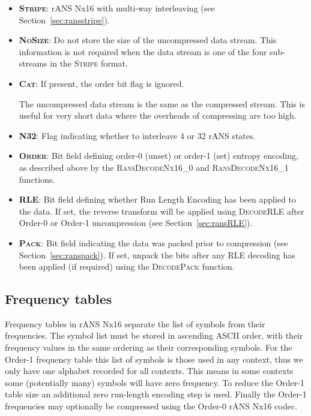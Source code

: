\documentclass[a4paper]{article}
\begin{document}
\begin{itemize}
\item{\textbf{\textsc{Stripe}}:}
rANS Nx16 with multi-way interleaving (see Section~\ref{sec:ransstripe}).

\item{\textbf{\textsc{NoSize}}:}
Do not store the size of the uncompressed data stream.
This information is not required when the data stream is one of the four sub-streams in the \textsc{Stripe} format.

\item{\textbf{\textsc{Cat}}:}
If present, the order bit flag is ignored.

The uncompressed data stream is the same as the compressed stream.
This is useful for very short data where the overheads of compressing are too high.

\item{\textbf{\textsc{N32}}:}
Flag indicating whether to interleave 4 or 32 rANS states.

\item{\textbf{\textsc{Order}}:}
Bit field defining order-0 (unset) or order-1 (set) entropy encoding, as described above by the \textsc{RansDecodeNx16\_0} and \textsc{RansDecodeNx16\_1} functions.

\item{\textbf{\textsc{RLE}}:}
Bit field defining whether Run Length Encoding has been applied to the data.  If set, the reverse transform will be applied using \textsc{DecodeRLE} after Order-0 or Order-1 uncompression (see Section~\ref{sec:ransRLE}).

\item{\textbf{\textsc{Pack}}:}
Bit field indicating the data was packed prior to compression (see Section~\ref{sec:ranspack}).  If set, unpack the bits after any RLE decoding has been applied (if required) using the \textsc{DecodePack} function.
\end{itemize}

\subsection{Frequency tables}

Frequency tables in rANS Nx16 separate the list of symbols from their
frequencies.  The symbol list must be stored in ascending ASCII order,
with their frequency values in the same ordering as their
corresponding symbols.  For the Order-1 frequency table this list of
symbols is those used in any context, thus we only have one alphabet
recorded for all contexts.  This means in some contexts some
(potentially many) symbols will have zero frequency.  To reduce the
Order-1 table size an additional zero run-length encoding step is
used.  Finally the Order-1 frequencies may optionally be compressed
using the Order-0 rANS Nx16 codec.
\end{document}

